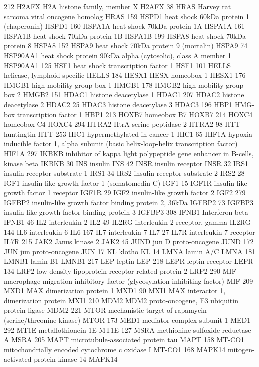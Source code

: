 212	H2AFX	H2A histone family, member X	H2AFX
38	HRAS	Harvey rat sarcoma viral oncogene homolog	HRAS
159	HSPD1	heat shock 60kDa protein 1 (chaperonin)	HSPD1
160	HSPA1A	heat shock 70kDa protein 1A	HSPA1A
161	HSPA1B	heat shock 70kDa protein 1B	HSPA1B
199	HSPA8	heat shock 70kDa protein 8	HSPA8
152	HSPA9	heat shock 70kDa protein 9 (mortalin)	HSPA9
74	HSP90AA1	heat shock protein 90kDa alpha (cytosolic), class A member 1	HSP90AA1
125	HSF1	heat shock transcription factor 1	HSF1
101	HELLS	helicase, lymphoid-specific	HELLS
184	HESX1	HESX homeobox 1	HESX1
176	HMGB1	high mobility group box 1	HMGB1
178	HMGB2	high mobility group box 2	HMGB2
151	HDAC1	histone deacetylase 1	HDAC1
207	HDAC2	histone deacetylase 2	HDAC2
25	HDAC3	histone deacetylase 3	HDAC3
196	HBP1	HMG-box transcription factor 1	HBP1
213	HOXB7	homeobox B7	HOXB7
214	HOXC4	homeobox C4	HOXC4
294	HTRA2	HtrA serine peptidase 2	HTRA2
98	HTT	huntingtin	HTT
253	HIC1	hypermethylated in cancer 1	HIC1
65	HIF1A	hypoxia inducible factor 1, alpha subunit (basic helix-loop-helix transcription factor)	HIF1A
297	IKBKB	inhibitor of kappa light polypeptide gene enhancer in B-cells, kinase beta	IKBKB
30	INS	insulin	INS
42	INSR	insulin receptor	INSR
32	IRS1	insulin receptor substrate 1	IRS1
34	IRS2	insulin receptor substrate 2	IRS2
28	IGF1	insulin-like growth factor 1 (somatomedin C)	IGF1
15	IGF1R	insulin-like growth factor 1 receptor	IGF1R
29	IGF2	insulin-like growth factor 2	IGF2
279	IGFBP2	insulin-like growth factor binding protein 2, 36kDa	IGFBP2
73	IGFBP3	insulin-like growth factor binding protein 3	IGFBP3
308	IFNB1	Interferon beta	IFNB1
46	IL2	interleukin 2	IL2
49	IL2RG	interleukin 2 receptor, gamma	IL2RG
144	IL6	interleukin 6	IL6
167	IL7	interleukin 7	IL7
27	IL7R	interleukin 7 receptor	IL7R
215	JAK2	Janus kinase 2	JAK2
45	JUND	jun D proto-oncogene	JUND
172	JUN	jun proto-oncogene	JUN
17	KL	klotho	KL
14	LMNA	lamin A/C	LMNA
181	LMNB1	lamin B1	LMNB1
217	LEP	leptin	LEP
218	LEPR	leptin receptor	LEPR
134	LRP2	low density lipoprotein receptor-related protein 2	LRP2
290	MIF	macrophage migration inhibitory factor (glycosylation-inhibiting factor)	MIF
209	MXD1	MAX dimerization protein 1	MXD1
90	MXI1	MAX interactor 1, dimerization protein	MXI1
210	MDM2	MDM2 proto-oncogene, E3 ubiquitin protein ligase	MDM2
221	MTOR	mechanistic target of rapamycin (serine/threonine kinase)	MTOR
173	MED1	mediator complex subunit 1	MED1
292	MT1E	metallothionein 1E	MT1E
127	MSRA	methionine sulfoxide reductase A	MSRA
205	MAPT	microtubule-associated protein tau	MAPT
158	MT-CO1	mitochondrially encoded cytochrome c oxidase I	MT-CO1
168	MAPK14	mitogen-activated protein kinase 14	MAPK14
